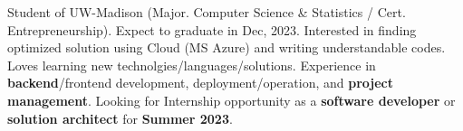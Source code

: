 

\begin{cvparagraph}

  Student of UW-Madison (Major. Computer Science \& Statistics / Cert. Entrepreneurship). Expect to graduate in Dec, 2023. Interested in finding optimized solution using Cloud (MS Azure) and writing understandable codes. Loves learning new technolgies/languages/solutions. Experience in \textbf{backend}/frontend development, deployment/operation, and \textbf{project management}.
  Looking for Internship opportunity as a \textbf{software developer} or \textbf{solution architect} for \textbf{Summer 2023}.
\end{cvparagraph}
